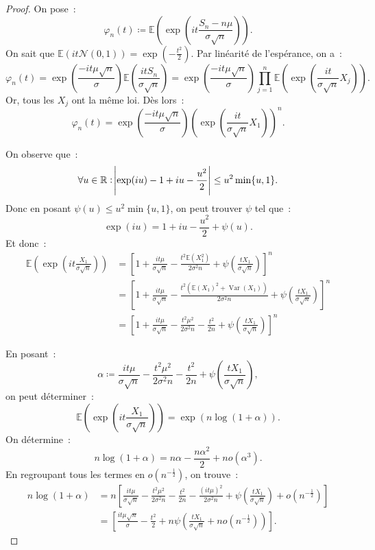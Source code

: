 \documentclass{article}
\newcommand{\E}{\mathbb E}
\newcommand{\R}{\mathbb R}
\newcommand{\Nzu}{\mathcal N(0, 1)}  %
\DeclareMathOperator{\Var}{Var}
\theoremstyle{definition}
\theoremstyle{remark}
\begin{document}
		\begin{proof} On pose~:
		\[\varphi_n(t) \coloneqq \E\left(\exp\left(it\frac {S_n - n\mu}{\sigma\sqrt n}\right)\right).\]
		On sait que $\E(it\Nzu) = \exp\left(-\frac {t^2}2\right)$. Par linéarité de l'espérance, on a~:
		\[\varphi_n(t) = \exp\left(\frac {-it\mu\sqrt n}\sigma\right)\E\left(\frac {itS_n}{\sigma\sqrt n}\right)
		= \exp\left(\frac {-it\mu\sqrt n}\sigma\right)\prod_{j=1}^n\E\left(\exp\left(\frac {it}{\sigma\sqrt n}X_j\right)\right).\]
		Or, tous les $X_j$ ont la même loi. Dès lors~:
		\[\varphi_n(t) = \exp\left(\frac {-it\mu\sqrt n}\sigma\right)\left(\exp\left(\frac {it}{\sigma\sqrt n}X_1\right)\right)^n.\]

		On observe que~:
		\[\forall u \in \R : \abs{\exp(iu) - 1 + iu - \frac {u^2}2} \leq u^2\min\{u, 1\}.\]
		Donc en posant $\psi(u) \leq u^2\min\{u, 1\}$, on peut trouver $\psi$ tel que~:
		\[\exp(iu) = 1 + iu - \frac {u^2}2 + \psi(u).\]
		Et donc~:
		\begin{align*}\E\left(\exp\left(it\frac {X_1}{\sigma \sqrt n}\right)\right)
		 &= \left[1 + \frac {it\mu}{\sigma\sqrt n} - \frac {t^2\E(X_1^2)}{2\sigma^2n} + \psi\left(\frac {tX_1}{\sigma \sqrt n}\right)\right]^n \\
		 &= \left[1 + \frac {it\mu}{\sigma\sqrt n} - \frac {t^2(\E(X_1)^2 + \Var(X_1))}{2\sigma^2n} + \psi\left(\frac {tX_1}{\sigma \sqrt n}\right)\right]^n \\
		 &= \left[1 + \frac {it\mu}{\sigma\sqrt n} - \frac {t^2\mu^2}{2\sigma^2n} - \frac {t^2}{2n} + \psi\left(\frac {tX_1}{\sigma \sqrt n}\right)\right]^n
		\end{align*}
		
		En posant~:
		\[\alpha \coloneqq \frac {it\mu}{\sigma\sqrt n} - \frac {t^2\mu^2}{2\sigma^2n} - \frac {t^2}{2n} + \psi\left(\frac {tX_1}{\sigma \sqrt n}\right),\]
		on peut déterminer~:
		\[\E\left(\exp\left(it\frac {X_1}{\sigma\sqrt n}\right)\right) = \exp\left(n\log(1 + \alpha)\right).\]
		On détermine~:
		\[n\log(1 + \alpha) = n\alpha - \frac {n\alpha^2}2 + no(\alpha^3).\]
		En regroupant tous les termes en $o(n^{-\frac 12})$, on trouve~:
		\begin{align*}
			n\log(1 + \alpha) &= n\left[\frac {it\mu}{\sigma\sqrt n} - \frac {t^2\mu^2}{2\sigma^2n} - \frac {t^2}{2n} - \frac {(it\mu)^2}{2\sigma^2n} +
				\psi\left(\frac {tX_1}{\sigma \sqrt n}\right) + o(n^{-\frac 12})\right] \\
			&= \left[\frac {it\mu\sqrt n}\sigma - \frac {t^2}2 + n\psi\left(\frac {tX_1}{\sigma\sqrt n} + no(n^{-\frac 12})\right)\right].
		\end{align*}


\end{proof}
\end{document}
